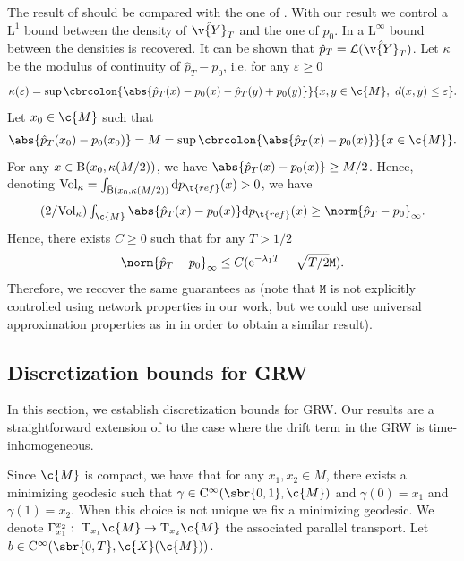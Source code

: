 The result of  should be compared with the one of \cite[Theorem 3]{rozen2021moser}.
With our result we control a $\mathrm{L}^1$ bound between the density of $\hat{\v{Y}}_T$ and the one of $p_0$.
In \cite[Theorem 3]{rozen2021moser} a $\mathrm{L}^\infty$ bound between the densities is recovered.
It can be shown that $\hat{p}_T = \mathcal{L}(\hat{\v{Y}}_T)$.
Let $\kappa$ be the modulus of continuity of $\hat{p}_T - p_0$, i.e. for any $\varepsilon \geq 0$ \begin{equation} \kappa(\varepsilon) = \sup \cbrcolon{\abs{\hat{p}_T(x) - p_0(x) - \hat{p}_T(y) + p_0(y)}}{x, y \in \c{M}, \ d(x,y) \leq \varepsilon} .
\end{equation}
Let $x_0 \in \c{M}$ such that \begin{equation} \abs{\hat{p}_T(x_0) - p_0(x_0)} = M = \sup \cbrcolon{\abs{\hat{p}_T(x) - p_0(x)}}{x \in \c{M}} .
\end{equation}
For any $x \in \bar{\operatorname{B}}(x_0,\kappa(M/2))$, we have $\abs{\hat{p}_T(x) - p_0(x)} \geq M/2$.
Hence, denoting $\mathrm{Vol}_\kappa = \int_{\cball{x_0}{\kappa(M/2)}} \mathrm{d} p_{\t{ref}}(x) > 0$, we have \begin{equation} \textstyle{ (2/\mathrm{Vol}_\kappa) \int_{\c{M}} \abs{\hat{p}_T(x) - p_0(x)} \mathrm{d} p_{\t{ref}}(x) \geq \norm{\hat{p}_T - p_0}_\infty.
	}
\end{equation}
Hence, there exists $C \geq 0$ such that for any $T > 1/2$ \begin{equation} \norm{\hat{p}_T - p_0}_\infty \leq C ( \mathrm{e}^{-\lambda_1 T} + \sqrt{T/2} \mathtt{M} ) .
\end{equation}
Therefore, we recover the same guarantees as  (note that $\mathtt{M}$ is not explicitly controlled using network properties in our work, but we could use universal approximation properties as in \textcite{rozen2021moser} in order to obtain a similar result).

\subsection{Discretization bounds for GRW}
\label{sec:discr-bounds-grw}

In this section, we establish discretization bounds for GRW.
Our results are a straightforward extension of \textcite{cheng2022theorymanifold} to the case where the drift term in the GRW is time-inhomogeneous.

Since $\c{M}$ is compact, we have that for any $x_1, x_2 \in M$, there exists a minimizing geodesic such that $\gamma \in \mathrm{C}^\infty(\sbr{0,1}, \c{M})$ and $\gamma(0) = x_1$ and $\gamma(1) = x_2$.
When this choice is not unique we fix a minimizing geodesic.
We denote $\Gamma_{x_1}^{x_2}: \ \mathrm{T}_{x_1} \c{M} \to \mathrm{T}_{x_2} \c{M}$ the associated parallel transport.
Let $b \in \mathrm{C}^\infty(\sbr{0,T}, \c{X}(\c{M}))$.

